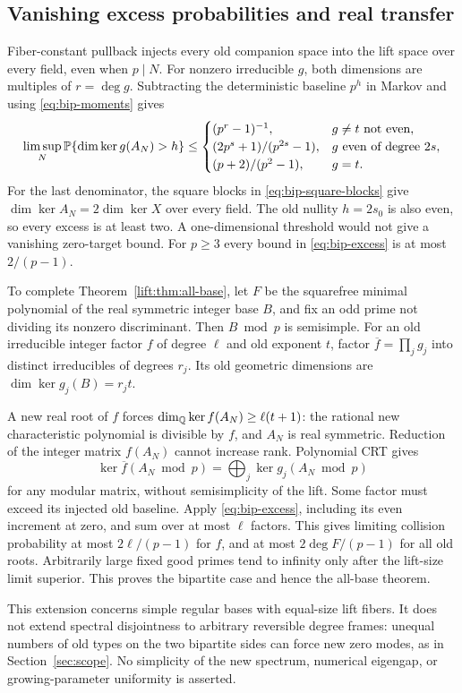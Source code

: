 \subsection{Vanishing excess probabilities and real transfer}
Fiber-constant pullback injects every old companion space into the
lift space over every field, even when $p\mid N$. For nonzero
irreducible $g$, both dimensions are multiples of $r=\deg g$.
Subtracting the deterministic baseline $p^h$ in Markov and using
\eqref{eq:bip-moments} gives
\begin{equation}\label{eq:bip-excess}
 \limsup_N\mathbb P\{\dim\ker g(A_N)>h\}\le
 \begin{cases}
 (p^r-1)^{-1},&g\ne t\text{ not even},\\
 (2p^s+1)/(p^{2s}-1),&g\text{ even of degree }2s,\\
 (p+2)/(p^2-1),&g=t.
 \end{cases}
\end{equation}
For the last denominator, the square blocks in
\eqref{eq:bip-square-blocks} give
$\dim\ker A_N=2\dim\ker X$ over every field. The old nullity
$h=2s_0$ is also even, so every excess is at least two. A
one-dimensional threshold would not give a vanishing zero-target
bound. For $p\ge3$ every bound in \eqref{eq:bip-excess} is at
most $2/(p-1)$.

To complete Theorem~\ref{lift:thm:all-base}, let $F$ be the squarefree
minimal polynomial of the real symmetric integer base $B$, and
fix an odd prime not dividing its nonzero discriminant. Then
$B\bmod p$ is semisimple. For an old irreducible integer factor
$f$ of degree $\ell$ and old exponent $t$, factor
$\overline f=\prod_jg_j$ into distinct irreducibles of degrees $r_j$.
Its old geometric dimensions are $\dim\ker g_j(B)=r_jt$.

A new real root of $f$ forces
$\dim_\mathbb Q\ker f(A_N)\ge\ell(t+1)$: the rational new characteristic
polynomial is divisible by $f$, and $A_N$ is real symmetric.
Reduction of the integer matrix $f(A_N)$ cannot increase rank.
Polynomial CRT gives
\[
 \ker\overline f(A_N\bmod p)
       =\bigoplus_j\ker g_j(A_N\bmod p)
\]
for any modular matrix, without semisimplicity of the lift.
Some factor must exceed its injected old baseline. Apply
\eqref{eq:bip-excess}, including its even increment at zero, and
sum over at most $\ell$ factors. This gives limiting collision
probability at most $2\ell/(p-1)$ for $f$, and at most
$2\deg F/(p-1)$ for all old roots. Arbitrarily large fixed good
primes tend to infinity only after the lift-size limit superior.
This proves the bipartite case and hence the all-base theorem.

This extension concerns simple regular bases with equal-size lift
fibers. It does not extend spectral disjointness to arbitrary
reversible degree frames: unequal numbers of old types on the two
bipartite sides can force new zero modes, as in Section~\ref{sec:scope}.
No simplicity of the new spectrum, numerical eigengap, or
growing-parameter uniformity is asserted.

